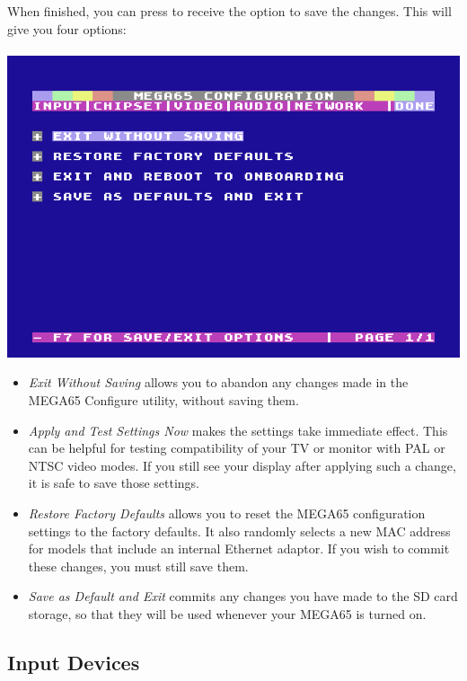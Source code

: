 \begin{minipage}{\linewidth}
  When finished, you can press  to receive the
  option to save the changes. This will give you four options: \\
  \\
  \includegraphics[width=\linewidth]{images/ss-m65config-save.png}
\end{minipage}

\begin{itemize}
  \item{\em Exit Without Saving} allows you to abandon any changes
    made in the MEGA65 Configure utility, without saving them.
  \item{\em Apply and Test Settings Now} makes the settings take
    immediate effect.  This can be helpful for testing compatibility
    of your TV or monitor with PAL or NTSC video modes.  If you
    still see your display after applying such a change,
    it is safe to save those settings.
  \item{\em Restore Factory Defaults} allows you to reset the
    MEGA65 configuration settings to the factory defaults. It also
    randomly selects a new MAC address for models that include an
    internal Ethernet adaptor.  If you wish to commit these
    changes, you must still save them.
  \item{\em Save as Default and Exit} commits any changes you
    have made to the SD card storage, so that they will be used
    whenever your MEGA65 is turned on.
\end{itemize}

\subsection{Input Devices}

